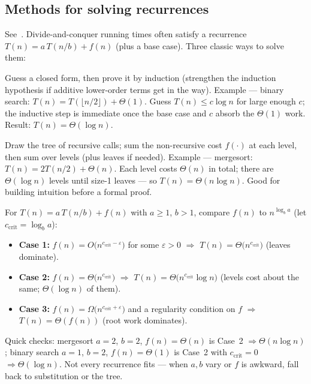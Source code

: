 \subsection{Methods for solving recurrences}
See~\cite{algo-clrs}. Divide-and-conquer running times often satisfy a recurrence
$T(n) = a\, T(n/b) + f(n)$ (plus a base case). Three classic ways to solve them:

Guess a closed form, then prove it by induction (strengthen the induction hypothesis
if additive lower-order terms get in the way).
Example --- binary search: $T(n) = T(\lfloor n/2\rfloor) + \Theta(1)$.
Guess $T(n) \le c\log n$ for large enough $c$; the inductive step is immediate once
the base case and $c$ absorb the $\Theta(1)$ work. Result: $T(n) = \Theta(\log n)$.

Draw the tree of recursive calls; sum the non-recursive cost $f(\cdot)$ at each level,
then sum over levels (plus leaves if needed).
Example --- mergesort: $T(n) = 2T(n/2) + \Theta(n)$.
Each level costs $\Theta(n)$ in total; there are $\Theta(\log n)$ levels until size-1
leaves --- so $T(n) = \Theta(n\log n)$. Good for building intuition before a formal proof.

For $T(n) = a\, T(n/b) + f(n)$ with $a \ge 1$, $b > 1$, compare $f(n)$ to
$n^{\log_b a}$ (let $c_{\mathrm{crit}} = \log_b a$):
\begin{itemize}
    \item \textbf{Case 1:} $f(n) = O\!\bigl(n^{c_{\mathrm{crit}}-\varepsilon}\bigr)$ for some
          $\varepsilon > 0$ $\Rightarrow$ $T(n) = \Theta\!\bigl(n^{c_{\mathrm{crit}}}\bigr)$
          (leaves dominate).
    \item \textbf{Case 2:} $f(n) = \Theta\!\bigl(n^{c_{\mathrm{crit}}}\bigr)$
          $\Rightarrow$ $T(n) = \Theta\!\bigl(n^{c_{\mathrm{crit}}}\log n\bigr)$
          (levels cost about the same; $\Theta(\log n)$ of them).
    \item \textbf{Case 3:} $f(n) = \Omega\!\bigl(n^{c_{\mathrm{crit}}+\varepsilon}\bigr)$
          and a regularity condition on $f$
          $\Rightarrow$ $T(n) = \Theta(f(n))$ (root work dominates).
\end{itemize}
Quick checks: mergesort $a{=}2$, $b{=}2$, $f(n){=}\Theta(n)$ is Case~2
$\Rightarrow \Theta(n\log n)$; binary search $a{=}1$, $b{=}2$, $f(n){=}\Theta(1)$ is
Case~2 with $c_{\mathrm{crit}}{=}0$ $\Rightarrow \Theta(\log n)$.
Not every recurrence fits --- when $a,b$ vary or $f$ is awkward, fall back to
substitution or the tree.

